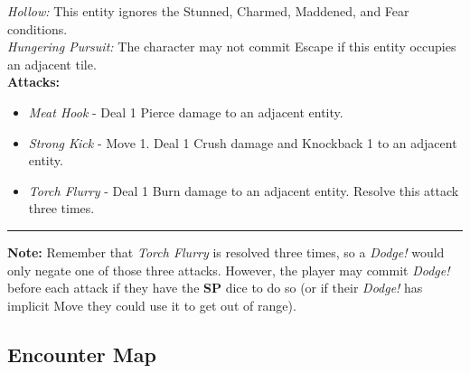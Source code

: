 \emph{Hollow:} This entity ignores the Stunned, Charmed, Maddened, and Fear conditions.\\

\emph{Hungering Pursuit:} The character may not commit Escape if this entity occupies an adjacent tile.\\

\textbf{Attacks:}
\begin{itemize}
\item \emph{Meat Hook} - Deal 1 Pierce damage to an adjacent entity.
\item \emph{Strong Kick} - Move 1. Deal 1 Crush damage and Knockback 1 to an adjacent entity.
\item \emph{Torch Flurry} - Deal 1 Burn damage to an adjacent entity. Resolve this attack three times.
\end{itemize}
\hrule

\begin{tcolorbox}
\textbf{Note:} Remember that \emph{Torch Flurry} is resolved three times, so a \emph{Dodge!} would only negate one of those three attacks. However, the player may commit \emph{Dodge!} before each attack if they have the \textbf{SP} dice to do so (or if their \emph{Dodge!} has implicit Move they could use it to get out of range).
\end{tcolorbox}

\subsection*{Encounter Map}

\begin{center}
\end{center}


